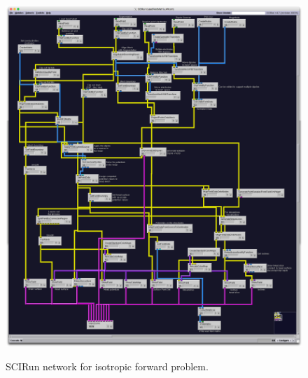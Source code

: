 \begin{figure}[p]
\begin{center}
\includegraphics[width=\textwidth]{Figures/iso_network.png}\\
\caption{SCIRun network for isotropic forward problem.}
\label{fig:isofornet}
\end{center}
\end{figure}

